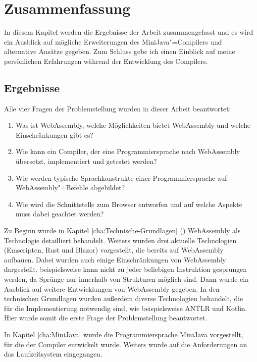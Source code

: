 \chapter{Zusammenfassung}

In diesem Kapitel werden die Ergebnisse der Arbeit zusammengefasst und es wird ein Ausblick auf mögliche Erweiterungen des MiniJava"=Compilers und alternative Ansätze gegeben. Zum Schluss gebe ich einen Einblick auf meine persönlichen Erfahrungen während der Entwicklung des Compilers.

\section{Ergebnisse}

Alle vier Fragen der Problemstellung wurden in dieser Arbeit beantwortet:
\begin{enumerate}
	\item Was ist WebAssembly, welche Möglichkeiten bietet WebAssembly und welche Einschränkungen gibt es?
	\item Wie kann ein Compiler, der eine Programmiersprache nach WebAssembly übersetzt, implementiert und getestet werden?
	\item Wie werden typische Sprachkonstrukte einer Programmiersprache auf WebAssembly"=Befehle abgebildet?
	\item Wie wird die Schnittstelle zum Browser entworfen und auf welche Aspekte muss dabei geachtet werden?
\end{enumerate}

Zu Beginn wurde in Kapitel \ref{cha:Technische-Grundlagen} () WebAssembly als Technologie detailliert behandelt. Weiters wurden drei aktuelle Technologien (Emscripten, Rust und Blazor) vorgestellt, die bereits auf WebAssembly aufbauen. Dabei wurden auch einige Einschränkungen von WebAssembly dargestellt, beispielsweise kann nicht zu jeder beliebigen Instruktion gesprungen werden, da Sprünge nur innerhalb von Strukturen möglich sind. Dann wurde ein Ausblick auf weitere Entwicklungen von WebAssembly gegeben. In den technischen Grundlagen wurden außerdem diverse Technologien behandelt, die für die Implementierung notwendig sind, wie beispielsweise ANTLR und Kotlin. Hier wurde somit die erste Frage der Problemstellung beantwortet.

In Kapitel \ref{cha:MiniJava} wurde die Programmiersprache MiniJava vorgestellt, für die der Compiler entwickelt wurde. Weiters wurde auf die Anforderungen an das Laufzeitsystem eingegangen.

